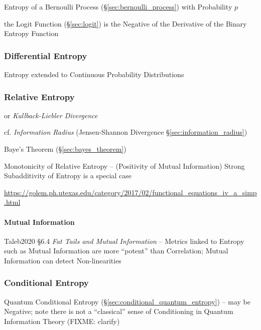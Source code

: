 Entropy of a Bernoulli Process (\S\ref{sec:bernoulli_process}) with Probability
$p$

the Logit Function (\S\ref{sec:logit}) is the Negative of the Derivative of the
Binary Entropy Function



\subsubsection{Differential Entropy}\label{sec:differential_entropy}

Entropy extended to Continuous Probability Distributions



\subsubsection{Relative Entropy}\label{sec:relative_entropy}

or \emph{Kullback-Liebler Divergence}

cf. \emph{Information Radius} (Jensen-Shannon Divergence
\S\ref{sec:information_radius})

\fist Baye's Theorem (\S\ref{sec:bayes_theorem})

Monotonicity of Relative Entropy -- (Positivity of Mutual Information) Strong
Subadditivity of Entropy is a special case

\url{https://golem.ph.utexas.edu/category/2017/02/functional_equations_iv_a_simp.html}



\paragraph{Mutual Information}\label{sec:mutual_information}\hfill

Taleb2020 \S 6.4 \emph{Fat Tails and Mutual Information} -- Metrics linked to
Entropy such as Mutual Information are more ``potent'' than Correlation; Mutual
Information can detect Non-linearities



\subsubsection{Conditional Entropy}\label{sec:conditional_entropy}

\fist Quantum Conditional Entropy (\S\ref{sec:conditional_quantum_entropy}) --
may be Negative; note there is not a ``classical'' sense of Conditioning in
Quantum Information Theory (FIXME: clarify)

